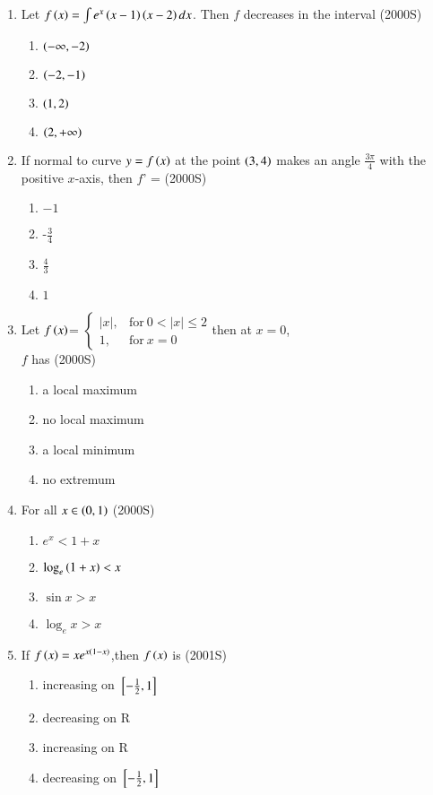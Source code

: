 \documentclass[journal,12pt,twocolumn]{IEEEtran}
\theoremstyle{remark}
\begin{document}
\begin{enumerate}[start=9]
\item Let $f\left(x\right)=\int e^x\left(x-1\right)\left(x-2\right)dx$. Then $f$ decreases in the interval 
\hfill (2000S)
\begin{enumerate}
	\item $\left(-\infty,-2\right)$
	\item $\left(-2,-1\right)$
	\item $\left(1,2\right)$
	\item $\left(2,+\infty\right)$\\
\end{enumerate}
\item If normal to curve $y=f\left(x\right)$ at the point $\left(3,4\right)$ makes an angle $\frac{3\pi}{4}$ with the positive $x$-axis, then $f$' = \hfill(2000S)
\begin{enumerate}
    \item $-1$
    \item -$\frac{3}{4}$\\
    \item $\frac{4}{3}$
    \item $1$
\end{enumerate}
\item Let $f\left(x\right)$=
$\begin{cases}
|x|, & \text{for}\ 0<|x| \leq 2\\ 
1, & \text{for}\  x=0
\end{cases}$then at $x=0$, \\$f$ has
\hfill (2000S)
\begin{enumerate}
    \item a local maximum
    \item no local maximum
    \item a local minimum
    \item no extremum\\
\end{enumerate}
\item For all $x\in\left(0,1\right)$
\hfill (2000S)
\begin{enumerate}
    \item $e^x <1+x$
    \item $\log_e \left(1+x\right) < x$
    \item$\sin{x} > x$
    \item$\log_e{x} > x $\\
\end{enumerate}
\item If $f\left(x\right)=xe^{x\left(1-x\right)}$,then $f\left(x\right)$ is 
\hfill (2001S)
\begin{enumerate}
    \item increasing on ${}\left[-\frac{1}{2},1\right]$\\
    \item decreasing on R
    \item increasing on R
    \item decreasing on ${}\left[-\frac{1}{2},1\right]$\\
\end{enumerate}


\end{enumerate}
\end{document}
